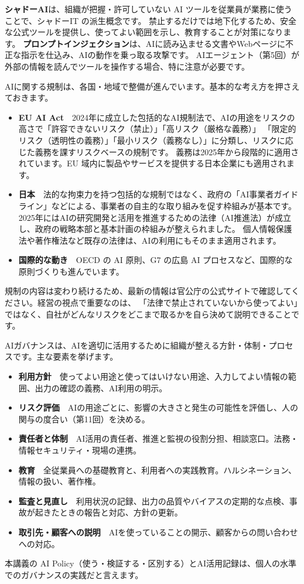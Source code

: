\textbf{シャドーAI}は、組織が把握・許可していない AI ツールを従業員が業務に使うことで、シャドーIT の派生概念です。
禁止するだけでは地下化するため、安全な公式ツールを提供し、使ってよい範囲を示し、教育することが対策になります。
\textbf{プロンプトインジェクション}は、AIに読み込ませる文書やWebページに不正な指示を仕込み、AIの動作を乗っ取る攻撃です。
AIエージェント（第5回）が外部の情報を読んでツールを操作する場合、特に注意が必要です。

AIに関する規制は、各国・地域で整備が進んでいます。基本的な考え方を押さえておきます。
\begin{itemize}
  \item \textbf{EU AI Act}　2024年に成立した包括的なAI規制法で、AIの用途をリスクの高さで「許容できないリスク（禁止）」「高リスク（厳格な義務）」
        「限定的リスク（透明性の義務）」「最小リスク（義務なし）」に分類し、リスクに応じた義務を課すリスクベースの規制です。
        義務は2025年から段階的に適用されています。EU 域内に製品やサービスを提供する日本企業にも適用されます。
  \item \textbf{日本}　法的な拘束力を持つ包括的な規制ではなく、政府の「AI事業者ガイドライン」などによる、事業者の自主的な取り組みを促す枠組みが基本です。
        2025年にはAIの研究開発と活用を推進するための法律（AI推進法）が成立し、政府の戦略本部と基本計画の枠組みが整えられました。
        個人情報保護法や著作権法など既存の法律は、AIの利用にもそのまま適用されます。
  \item \textbf{国際的な動き}　OECD の AI 原則、G7 の広島 AI プロセスなど、国際的な原則づくりも進んでいます。
\end{itemize}
規制の内容は変わり続けるため、最新の情報は官公庁の公式サイトで確認してください。経営の視点で重要なのは、
「法律で禁止されていないから使ってよい」ではなく、自社がどんなリスクをどこまで取るかを自ら決めて説明できることです。

AIガバナンスは、AIを適切に活用するために組織が整える方針・体制・プロセスです。主な要素を挙げます。
\begin{itemize}
  \item \textbf{利用方針}　使ってよい用途と使ってはいけない用途、入力してよい情報の範囲、出力の確認の義務、AI利用の明示。
  \item \textbf{リスク評価}　AIの用途ごとに、影響の大きさと発生の可能性を評価し、人の関与の度合い（第11回）を決める。
  \item \textbf{責任者と体制}　AI活用の責任者、推進と監視の役割分担、相談窓口。法務・情報セキュリティ・現場の連携。
  \item \textbf{教育}　全従業員への基礎教育と、利用者への実践教育。ハルシネーション、情報の扱い、著作権。
  \item \textbf{監査と見直し}　利用状況の記録、出力の品質やバイアスの定期的な点検、事故が起きたときの報告と対応、方針の更新。
  \item \textbf{取引先・顧客への説明}　AIを使っていることの開示、顧客からの問い合わせへの対応。
\end{itemize}
本講義の AI Policy（使う・検証する・区別する）とAI活用記録は、個人の水準でのガバナンスの実践だと言えます。

